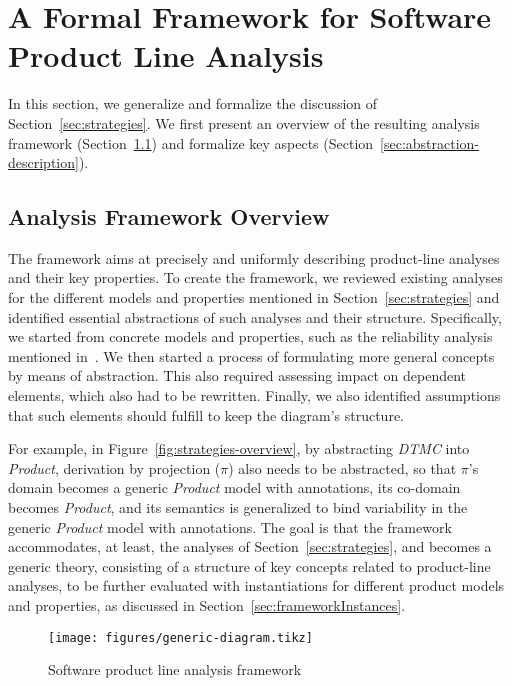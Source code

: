 \section{A Formal Framework for Software Product Line Analysis}
\label{sec:generalStructure}

In this section, we generalize and formalize the discussion of Section~\ref{sec:strategies}. We first present an overview of the resulting analysis framework (Section~\ref{sec:fmkoverview}) and formalize key aspects (Section~\ref{sec:abstraction-description}). 

\subsection{Analysis Framework Overview}
\label{sec:fmkoverview}

The framework aims at precisely and uniformly describing product-line analyses and their key properties. To create the framework, we reviewed existing analyses for the different models and properties mentioned in Section~\ref{sec:strategies} and identified essential abstractions of such analyses and their structure. 
Specifically, we started from concrete models and properties, such as the reliability analysis mentioned in~. We then started a process of formulating more general concepts by means of abstraction. This also required assessing impact on dependent elements, which also had to be rewritten. Finally, we also identified assumptions that such elements should fulfill to keep the diagram's structure.

For example, in Figure~\ref{fig:strategies-overview}, by abstracting \textit{DTMC} into \textit{Product}, derivation by projection ($\pi$) also needs to be abstracted, so that $\pi$'s domain becomes a generic \textit{Product} model with annotations, its co-domain becomes \textit{Product}, and its semantics is generalized to bind variability in the generic \textit{Product} model with annotations. 
The goal is that the framework accommodates, at least, the analyses of Section~\ref{sec:strategies}, and becomes a generic theory, consisting of a structure of key concepts related to product-line analyses, to be further evaluated with instantiations for different product models and properties, as discussed in Section~\ref{sec:frameworkInstances}.

\begin{figure}[!htbp]
	\centering
    \texttt{[image: figures/generic-diagram.tikz]}
	\caption{Software product line analysis framework}
	\label{fig:strategies-generic}
\end{figure}

